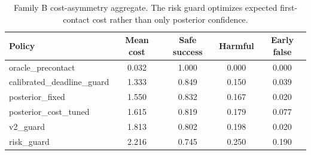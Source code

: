 \begin{table}[t]
\centering
\small
\caption{Family B cost-asymmetry aggregate. The risk guard optimizes expected first-contact cost rather than only posterior confidence.}
\label{tab:cost-policy}
\begin{tabular}{lcccc}
\toprule
Policy & Mean cost & Safe success & Harmful & Early false \\
\midrule
oracle\_precontact & 0.032 & 1.000 & 0.000 & 0.000 \\
calibrated\_deadline\_guard & 1.333 & 0.849 & 0.150 & 0.039 \\
posterior\_fixed & 1.550 & 0.832 & 0.167 & 0.020 \\
posterior\_cost\_tuned & 1.615 & 0.819 & 0.179 & 0.077 \\
v2\_guard & 1.813 & 0.802 & 0.198 & 0.020 \\
risk\_guard & 2.216 & 0.745 & 0.250 & 0.190 \\
\bottomrule
\end{tabular}
\end{table}
